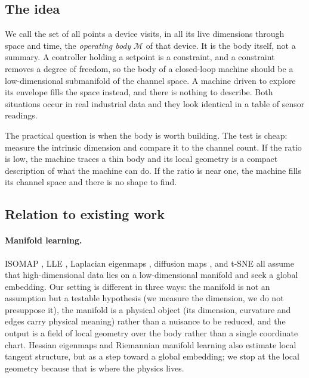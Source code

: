 \documentclass[11pt]{article}
\newcommand{\bdy}{\mathcal{M}}
\begin{document}
\subsection{The idea}

We call the set of all points a device visits, in all its live dimensions
through space and time, the \emph{operating body} $\bdy$ of that device. It is
the body itself, not a summary. A controller holding a setpoint is a
constraint, and a constraint removes a degree of freedom, so the body of a
closed-loop machine should be a low-dimensional submanifold of the
channel space. A machine driven to explore its envelope fills the space
instead, and there is nothing to describe. Both situations occur in real
industrial data and they look identical in a table of sensor readings.

The practical question is when the body is worth building. The test is cheap:
measure the intrinsic dimension and compare it to the channel count. If the
ratio is low, the machine traces a thin body and its local geometry is a
compact description of what the machine can do. If the ratio is near one, the
machine fills its channel space and there is no shape to find.

\subsection{Relation to existing work}

\paragraph{Manifold learning.} ISOMAP \cite{tenenbaum2000}, LLE
\cite{roweis2000}, Laplacian eigenmaps \cite{belkin2003}, diffusion maps
\cite{coifman2006}, and t-SNE \cite{vandermaaten2008} all assume that
high-dimensional data lies on a low-dimensional manifold and seek a
global embedding. Our setting is different in three ways: the manifold is not
an assumption but a testable hypothesis (we measure the dimension, we do not
presuppose it), the manifold is a physical object (its dimension, curvature and
edges carry physical meaning) rather than a nuisance to be reduced, and the
output is a field of local geometry over the body rather than a single
coordinate chart. Hessian eigenmaps \cite{donoho2003} and Riemannian manifold
learning \cite{lin2008} also estimate local tangent structure, but as a step
toward a global embedding; we stop at the local geometry because that is where
the physics lives.
\end{document}
